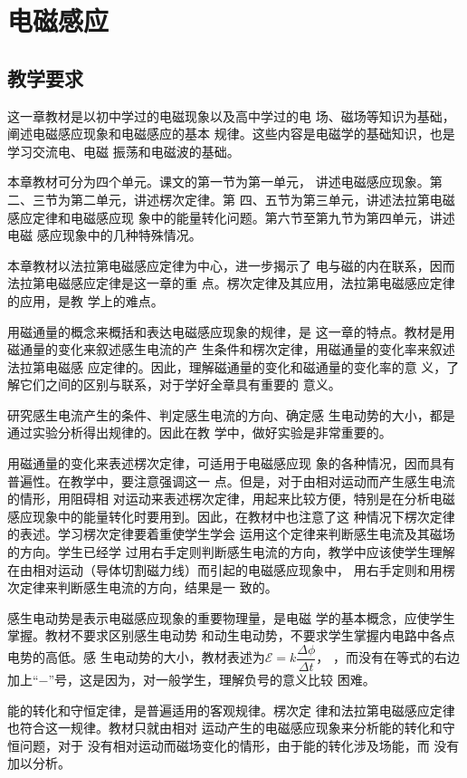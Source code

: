 \chapter{电磁感应}
\minitoc[n]
\section{教学要求}
这一章教材是以初中学过的电磁现象以及高中学过的电
场、磁场等知识为基础，阐述电磁感应现象和电磁感应的基本
规律。这些内容是电磁学的基础知识，也是学习交流电、电磁
振荡和电磁波的基础。

本章教材可分为四个单元。课文的第一节为第一单元，
讲述电磁感应现象。第二、三节为第二单元，讲述楞次定律。第
四、五节为第三单元，讲述法拉第电磁感应定律和电磁感应现
象中的能量转化问题。第六节至第九节为第四单元，讲述电磁
感应现象中的几种特殊情况。

本章教材以法拉第电磁感应定律为中心，进一步揭示了
电与磁的内在联系，因而法拉第电磁感应定律是这一章的重
点。楞次定律及其应用，法拉第电磁感应定律的应用，是教
学上的难点。

用磁通量的概念来概括和表达电磁感应现象的规律，是
这一章的特点。教材是用磁通量的变化来叙述感生电流的产
生条件和楞次定律，用磁通量的变化率来叙述法拉第电磁感
应定律的。因此，理解磁通量的变化和磁通量的变化率的意
义，了解它们之间的区别与联系，对于学好全章具有重要的
意义。

研究感生电流产生的条件、判定感生电流的方向、确定感
生电动势的大小，都是通过实验分析得出规律的。因此在教
学中，做好实验是非常重要的。

用磁通量的变化来表述楞次定律，可适用于电磁感应现
象的各种情况，因而具有普遍性。在教学中，要注意强调这一
点。但是，对于由相对运动而产生感生电流的情形，用阻碍相
对运动来表述楞次定律，用起来比较方便，特别是在分析电磁
感应现象中的能量转化时要用到。因此，在教材中也注意了这
种情况下楞次定律的表述。学习楞次定律要着重使学生学会
运用这个定律来判断感生电流及其磁场的方向。学生已经学
过用右手定则判断感生电流的方向，教学中应该使学生理解
在由相对运动（导体切割磁力线）而引起的电磁感应现象中，
用右手定则和用楞次定律来判断感生电流的方向，结果是一
致的。

感生电动势是表示电磁感应现象的重要物理量，是电磁
学的基本概念，应使学生掌握。教材不要求区别感生电动势
和动生电动势，不要求学生掌握内电路中各点电势的高低。感
生电动势的大小，教材表述为$\mathcal{E}=k\dfrac{\Delta\phi}{\Delta t}$，
，而没有在等式的右边
加上“$-$”号，这是因为，对一般学生，理解负号的意义比较
困难。

能的转化和守恒定律，是普遍适用的客观规律。楞次定
律和法拉第电磁感应定律也符合这一规律。教材只就由相对
运动产生的电磁感应现象来分析能的转化和守恒问题，对于
没有相对运动而磁场变化的情形，由于能的转化涉及场能，而
没有加以分析。

